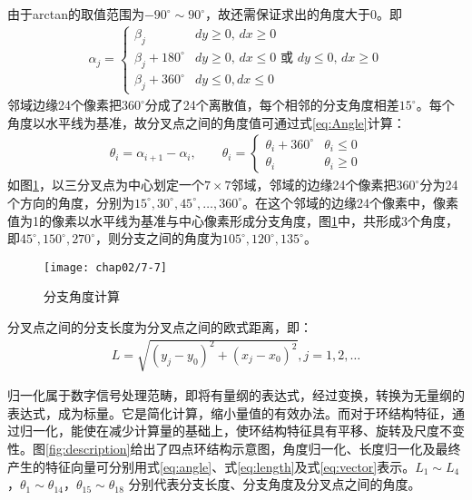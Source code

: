 由于arctan的取值范围为$-90^{\circ} \sim 90^{\circ}$，故还需保证求出的角度大于0。即
\begin{align}
\alpha_j = \left\{ \begin{array}{ll}
\beta_j & \textrm{$dy \geq 0$, $dx \geq 0$} \\
\beta_j + 180^{\circ} & \textrm{$dy \geq 0$, $dx \leq 0$ 或 $dy \leq 0$, $dx \geq 0$}\\
\beta_j + 360^{\circ} & \textrm{$dy \leq 0, dx \leq 0$}
\end{array} \right.
\end{align}
邻域边缘24个像素把$360^{\circ}$分成了24个离散值，每个相邻的分支角度相差$15^{\circ}$。每个角度以水平线为基准，故分叉点之间的角度值可通过式\ref{eq:Angle}计算：
\begin{align}
\theta_i = \alpha_{i+1} - \alpha_i, \qquad
\theta_i = \left\{ \begin{array}{ll}
\theta_i + 360^{\circ} & \theta_i \le 0 \\
\theta_i & \theta_i \geq 0
\end{array} \right.
\label{eq:Angle}
\end{align}
如图\ref{fig:calculate-angles}，以三分叉点为中心划定一个$7\times7$邻域，邻域的边缘24个像素把$360^{\circ}$分为24个方向的角度，分别为$15^{\circ}, 30^{\circ},45^{\circ}, \ldots, 360^{\circ}$。在这个邻域的边缘24个像素中，像素值为1的像素以水平线为基准与中心像素形成分支角度，图\ref{fig:calculate-angles}中，共形成3个角度，即$45^{\circ}, 150^{\circ},270^{\circ}$，则分支之间的角度为$105^{\circ}, 120^{\circ}, 135^{\circ}$。

\begin{figure}[H]
\centering
\texttt{[image: chap02/7-7]}
\caption{分支角度计算}
\label{fig:calculate-angles}
\end{figure}

分叉点之间的分支长度为分叉点之间的欧式距离，即：
\begin{align}
L = \sqrt{(y_j - y_0)^2 + (x_j - x_0)^2}, j = 1, 2, \ldots
\end{align}

归一化属于数字信号处理范畴，即将有量纲的表达式，经过变换，转换为无量纲的表达式，成为标量。它是简化计算，缩小量值的有效办法。而对于环结构特征，通过归一化，能使在减少计算量的基础上，使环结构特征具有平移、旋转及尺度不变性。图\ref{fig:description}给出了四点环结构示意图，角度归一化、长度归一化及最终产生的特征向量可分别用式\ref{eq:angle}、式\ref{eq:length}及式\ref{eq:vector}表示。$L_{1} \sim L_{4}$，$\theta_{1} \sim \theta_{14}$，$\theta_{15} \sim \theta_{18}$ 分别代表分支长度、分支角度及分叉点之间的角度。

